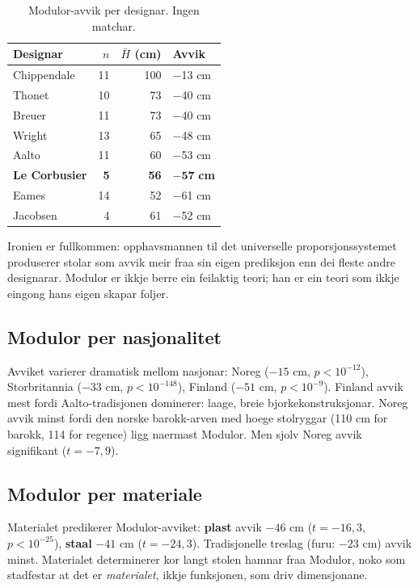 \documentclass[10pt, a4paper, twocolumn]{article}
\begin{document}
\begin{table}[!ht]
\centering
\caption{Modulor-avvik per designar. Ingen matchar.}
\label{tab:modulor_designer}
\begin{tabular}{lrrl}
\toprule
\textbf{Designar} & $n$ & $\bar{H}$ (cm) & \textbf{Avvik} \\
\midrule
Chippendale & 11 & 100 & $-$13 cm \\
Thonet & 10 & 73 & $-$40 cm \\
Breuer & 11 & 73 & $-$40 cm \\
Wright & 13 & 65 & $-$48 cm \\
Aalto & 11 & 60 & $-$53 cm \\
\textbf{Le Corbusier} & \textbf{5} & \textbf{56} & $\mathbf{-57}$ \textbf{cm} \\
Eames & 14 & 52 & $-$61 cm \\
Jacobsen & 4 & 61 & $-$52 cm \\
\bottomrule
\end{tabular}
\end{table}

Ironien er fullkommen: opphavsmannen til det universelle proporsjonssystemet produserer stolar som avvik meir fraa sin eigen prediksjon enn dei fleste andre designarar. Modulor er ikkje berre ein feilaktig teori; han er ein teori som ikkje eingong hans eigen skapar foljer.

\subsection{Modulor per nasjonalitet}

Avviket varierer dramatisk mellom nasjonar: Noreg ($-15$ cm, $p < 10^{-12}$), Storbritannia ($-33$ cm, $p < 10^{-148}$), Finland ($-51$ cm, $p < 10^{-9}$). Finland avvik mest fordi Aalto-tradisjonen dominerer: laage, breie bjorkekonstruksjonar. Noreg avvik minst fordi den norske barokk-arven med hoege stolryggar (110 cm for barokk, 114 for regence) ligg naermast Modulor. Men sjolv Noreg avvik signifikant ($t = -7{,}9$).

\subsection{Modulor per materiale}

Materialet predikerer Modulor-avviket: \textbf{plast} avvik $-46$ cm ($t = -16{,}3$, $p < 10^{-25}$), \textbf{staal} $-41$ cm ($t = -24{,}3$). Tradisjonelle treslag (furu: $-23$ cm) avvik minst. Materialet determinerer kor langt stolen hamnar fraa Modulor, noko som stadfestar at det er \emph{materialet}, ikkje funksjonen, som driv dimensjonane.
\end{document}
